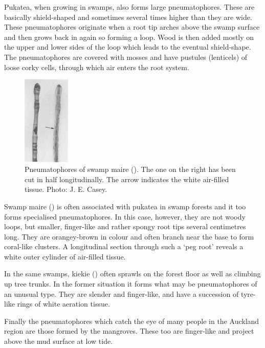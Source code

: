 Pukatea, when growing in swamps, also forms large pneumatophores.
These are basically shield-shaped and sometimes several times higher than they are wide.
These pneumatophores originate when a root tip arches above the swamp surface and then grows back in again so forming a loop.
Wood is then added mostly on the upper and lower sides of the loop which leads to the eventual shield-shape.
The pneumatophores are covered with mosses and have pustules (lenticels) of loose corky cells, through which air enters the root system.

\begin{figure}
	\includegraphics[width=0.2\textwidth]{graphics/figure12swampmaire.jpg}
	\centering
	\caption[Pneumatophores of swamp maire]{Pneumatophores of swamp maire ().
    The one on the right has been cut in half longitudinally.
    The arrow indicates the white air-filled tissue.
    Photo:  J. E. Casey.}
	\label{fig:12swampmaire}
\end{figure}

Swamp maire () is often associated with pukatea in swamp forests and it too forms specialised pneumatophores.
In this case, however, they are not woody loops, but smaller, finger-like and rather spongy root tips several centimetres long.
They are orangey-brown in colour and often branch near the base to form coral-like clusters.
A longitudinal section through such a `peg root' reveals a white outer cylinder of air-filled tissue.

In the same swamps, kiekie () often sprawls on the forest floor as well as climbing up tree trunks.
In the former situation it forms what may be pneumatophores of an unusual type.
They are slender and finger-like, and have a succession of tyre-like rings of white aeration tissue.

Finally the pneumatophores which catch the eye of many people in the Auckland region are those formed by the mangroves.
These too are finger-like and project above the mud surface at low tide.

